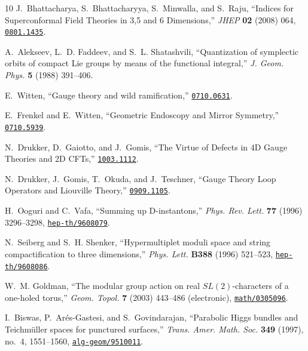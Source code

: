 \begin{thebibliography}{10}
J.~Bhattacharya, S.~Bhattacharyya, S.~Minwalla, and S.~Raju, ``{Indices for
  Superconformal Field Theories in 3,5 and 6 Dimensions},'' {\em JHEP} {\bf 02}
  (2008) 064,
\href{http://www.arXiv.org/abs/0801.1435}{{\tt 0801.1435}}.

A.~Alekseev, L.~D. Faddeev, and S.~L. Shatashvili, ``{Quantization of
  symplectic orbits of compact Lie groups by means of the functional
  integral},'' {\em J. Geom. Phys.} {\bf 5} (1988)
391--406.

E.~Witten, ``Gauge theory and wild ramification,''
\href{http://www.arXiv.org/abs/0710.0631}{{\tt 0710.0631}}.

E.~Frenkel and E.~Witten, ``{Geometric Endoscopy and Mirror Symmetry},''
\href{http://www.arXiv.org/abs/0710.5939}{{\tt 0710.5939}}.

N.~Drukker, D.~Gaiotto, and J.~Gomis, ``{The Virtue of Defects in 4D Gauge
  Theories and 2D CFTs},''
\href{http://www.arXiv.org/abs/1003.1112}{{\tt 1003.1112}}.

N.~Drukker, J.~Gomis, T.~Okuda, and J.~Teschner, ``{Gauge Theory Loop Operators
  and Liouville Theory},''
\href{http://www.arXiv.org/abs/0909.1105}{{\tt 0909.1105}}.

H.~Ooguri and C.~Vafa, ``{S}umming up {D}-instantons,'' {\em Phys. Rev. Lett.}
  {\bf 77} (1996) 3296--3298,
\href{http://www.arXiv.org/abs/hep-th/9608079}{{\tt hep-th/9608079}}.

N.~Seiberg and S.~H. Shenker, ``Hypermultiplet moduli space and string
  compactification to three dimensions,'' {\em Phys. Lett.} {\bf B388} (1996)
  521--523,
\href{http://www.arXiv.org/abs/hep-th/9608086}{{\tt hep-th/9608086}}.

W.~M. Goldman, ``The modular group action on real {${SL}(2)$}-characters of a
  one-holed torus,'' {\em Geom. Topol.} {\bf 7} (2003) 443--486 (electronic),
  \href{http://www.arXiv.org/abs/math/0305096}{{\tt math/0305096}}.

I.~Biswas, P.~Ar{\'e}s-Gastesi, and S.~Govindarajan, ``Parabolic {H}iggs
  bundles and {T}eichm\"uller spaces for punctured surfaces,'' {\em Trans.
  Amer. Math. Soc.} {\bf 349} (1997), no.~4, 1551--1560,
  \href{http://www.arXiv.org/abs/alg-geom/9510011}{{\tt alg-geom/9510011}}.


\end{thebibliography}
